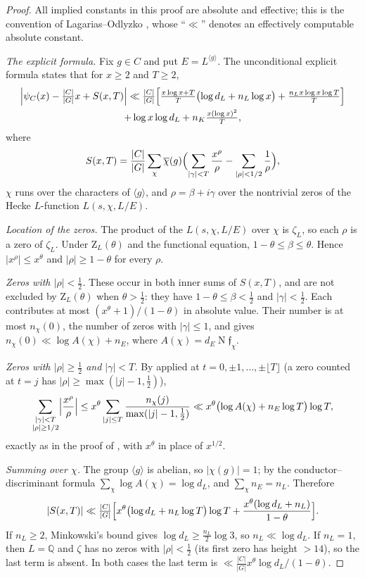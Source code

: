 \documentclass[11pt]{amsart}
\theoremstyle{definition}
\theoremstyle{remark}
\newcommand{\Q}{\mathbb{Q}}
\DeclareMathOperator{\Nm}{N}
\newcommand{\Zt}{\mathrm{Z}}       %
\begin{document}
\begin{proof}
All implied constants in this proof are absolute and effective; this is the convention of Lagarias--Odlyzko \cite[\S2]{LO},
whose ``$\ll$'' denotes an effectively computable absolute constant.

\emph{The explicit formula.} Fix $g\in C$ and put $E=L^{\langle g\rangle}$. The unconditional explicit formula
\cite[Thm.~7.1, (7.4)--(7.5)]{LO} states that for $x\ge2$ and $T\ge2$,
\begin{multline*}
  \Bigl|\psi_C(x)-\tfrac{|C|}{|G|}x+S(x,T)\Bigr|\ll\tfrac{|C|}{|G|}\Bigl[\tfrac{x\log x+T}{T}\bigl(\log d_L+n_L\log x\bigr)
  +\tfrac{n_Lx\log x\log T}{T}\Bigr]\\+\log x\log d_L+n_K\tfrac{x(\log x)^2}{T},
\end{multline*}
where
\[
  S(x,T)=\frac{|C|}{|G|}\sum_\chi\overline{\chi}(g)\Bigl(\sum_{|\gamma|<T}\frac{x^\rho}{\rho}-\sum_{|\rho|<1/2}\frac1\rho\Bigr),
\]
$\chi$ runs over the characters of $\langle g\rangle$, and $\rho=\beta+i\gamma$ over the nontrivial zeros of the Hecke
$L$-function $L(s,\chi,L/E)$.

\emph{Location of the zeros.} The product of the $L(s,\chi,L/E)$ over $\chi$ is $\zeta_L$, so each $\rho$ is a zero of
$\zeta_L$. Under $\Zt_L(\theta)$ and the functional equation, $1-\theta\le\beta\le\theta$. Hence $|x^\rho|\le x^\theta$
and $|\rho|\ge1-\theta$ for every $\rho$.

\emph{Zeros with $|\rho|<\tfrac12$.} These occur in both inner sums of $S(x,T)$, and are not excluded by
$\Zt_L(\theta)$ when $\theta>\frac12$: they have $1-\theta\le\beta<\frac12$ and $|\gamma|<\frac12$. Each contributes at
most $(x^\theta+1)/(1-\theta)$ in absolute value. Their number is at most $n_\chi(0)$, the number of zeros with
$|\gamma|\le1$, and \cite[Lemma~5.4]{LO} gives $n_\chi(0)\ll\log A(\chi)+n_E$, where $A(\chi)=d_E\Nm\mathfrak f_\chi$.

\emph{Zeros with $|\rho|\ge\tfrac12$ and $|\gamma|<T$.} By \cite[Lemma~5.4]{LO} applied at $t=0,\pm1,\dots,\pm\lfloor T\rfloor$ (a zero counted at $t=j$ has $|\rho|\ge\max(|j|-1,\frac12)$),
\[
  \sum_{\substack{|\gamma|<T\\|\rho|\ge1/2}}\Bigl|\frac{x^\rho}{\rho}\Bigr|\le x^\theta\sum_{|j|\le T}\frac{n_\chi(j)}{\max(|j|-1,\frac12)}
  \ll x^\theta\bigl(\log A(\chi)+n_E\log T\bigr)\log T,
\]
exactly as in the proof of \cite[Thm.~9.1]{LO}, with $x^\theta$ in place of $x^{1/2}$.

\emph{Summing over $\chi$.} The group $\langle g\rangle$ is abelian, so $|\chi(g)|=1$; by the conductor--discriminant
formula $\sum_\chi\log A(\chi)=\log d_L$, and $\sum_\chi n_E=n_L$. Therefore
\[
  |S(x,T)|\ll\tfrac{|C|}{|G|}\Bigl[x^\theta\bigl(\log d_L+n_L\log T\bigr)\log T+\frac{x^\theta(\log d_L+n_L)}{1-\theta}\Bigr].
\]
If $n_L\ge2$, Minkowski's bound gives $\log d_L\ge\frac{n_L}{2}\log3$, so $n_L\ll\log d_L$. If $n_L=1$, then $L=\Q$ and
$\zeta$ has no zeros with $|\rho|<\frac12$ (its first zero has height $>14$), so the last term is absent. In both cases the
last term is $\ll\frac{|C|}{|G|}x^\theta\log d_L/(1-\theta)$.


\end{proof}
\end{document}
